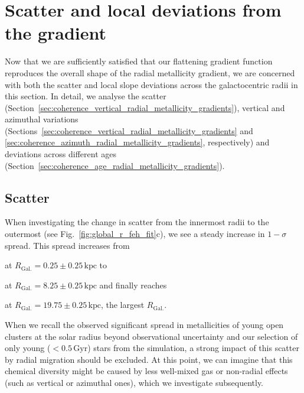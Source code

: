 \documentclass[fleqn,usenatbib]{mnras}
\newcommand{\nihaoAGEmax}{$0.5\,\mathrm{Gyr}$}
\begin{document}
\section{Scatter and local deviations from the gradient}
\label{sec:scatter_radial_metallicity_gradients}

Now that we are sufficiently satisfied that our flattening gradient function reproduces the overall shape of the radial metallicity gradient, we are concerned with both the scatter and local slope deviations across the galactocentric radii in this section. In detail, we analyse the scatter (Section~\ref{sec:coherence_vertical_radial_metallicity_gradients}), vertical and azimuthal variations (Sections~\ref{sec:coherence_vertical_radial_metallicity_gradients} and \ref{sec:coherence_azimuth_radial_metallicity_gradients}, respectively) and deviations across different ages (Section~\ref{sec:coherence_age_radial_metallicity_gradients}).

\subsection{Scatter}
\label{sec:scatter}

When investigating the change in scatter from the innermost radii to the outermost (see Fig.~\ref{fig:global_r_feh_fit}c), we see a steady increase in $1-\sigma$ spread. This spread increases from
\begin{description}
    \item  at $R_\mathrm{Gal.} = 0.25 \pm 0.25\,\mathrm{kpc}$ to
    \item  at $R_\mathrm{Gal.} = 8.25 \pm 0.25\,\mathrm{kpc}$ and finally reaches 
     \item  at $R_\mathrm{Gal.} = 19.75 \pm 0.25\,\mathrm{kpc}$, the largest $R_\mathrm{Gal.}$.
\end{description}

When we recall the observed significant spread in metallicities of young open clusters at the solar radius beyond observational uncertainty \citep[e.g.][]{Donor2020, Spina2021} and our selection of only young ($<$\nihaoAGEmax) stars from the simulation, a strong impact of this scatter by radial migration should be excluded. At this point, we can imagine that this chemical diversity might be caused by less well-mixed gas or non-radial effects (such as vertical or azimuthal ones), which we investigate subsequently.
\end{document}
